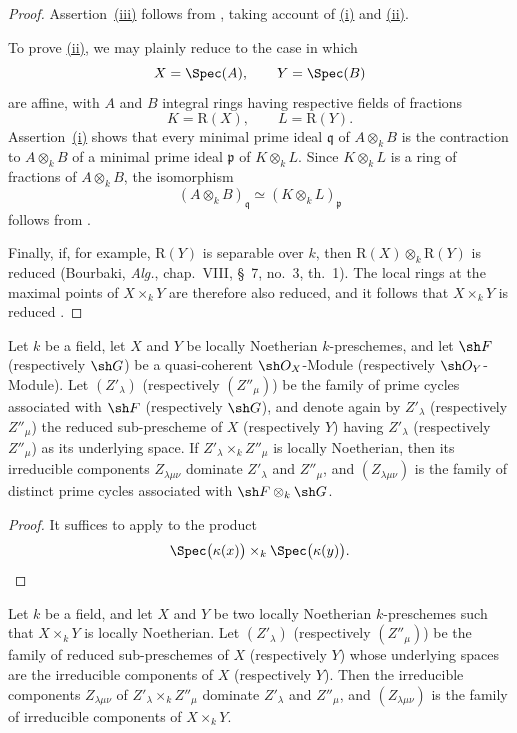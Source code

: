 \begin{proof}
Assertion~{\hyperref[IV.4.2.4.iii]{(iii)}} follows from
, taking account of
{\hyperref[IV.4.2.4.i]{(i)}} and {\hyperref[IV.4.2.4.ii]{(ii)}}.

To prove {\hyperref[IV.4.2.4.ii]{(ii)}}, we may plainly reduce to the case
in which
\[
X=\Spec(A),
\qquad
Y=\Spec(B)
\]
are affine, with $A$ and $B$ integral rings having respective fields of
fractions
\[
K=\mathrm R(X),
\qquad
L=\mathrm R(Y).
\]
Assertion~{\hyperref[IV.4.2.4.i]{(i)}} shows that every minimal prime ideal
$\mathfrak q$ of $A\otimes_k B$ is the contraction to $A\otimes_k B$
of a minimal prime ideal $\mathfrak p$ of $K\otimes_k L$.
Since $K\otimes_k L$ is a ring of fractions of $A\otimes_k B$, the
isomorphism
\[
(A\otimes_k B)_{\mathfrak q}
\simeq
(K\otimes_k L)_{\mathfrak p}
\]
follows from .

Finally, if, for example, $\mathrm R(Y)$ is separable over $k$, then
$\mathrm R(X)\otimes_k\mathrm R(Y)$ is reduced
(Bourbaki, \emph{Alg.}, chap.~VIII, \S~7, no.~3, th.~1).
The local rings at the maximal points of $X\times_k Y$ are therefore
also reduced, and it follows that $X\times_k Y$ is reduced
.
\end{proof}

\begin{proposition}[4.2.5]
\label{IV.4.2.5}
Let $k$ be a field, let $X$ and $Y$ be locally Noetherian
$k$-preschemes, and let $\sh F$ (respectively $\sh G$) be a
quasi-coherent $\sh O_X$-Module (respectively $\sh O_Y$-Module).
Let $(Z'_\lambda)$ (respectively $(Z''_\mu)$) be the family of prime
cycles associated with $\sh F$ (respectively $\sh G$), and denote again
by $Z'_\lambda$ (respectively $Z''_\mu$) the reduced sub-prescheme of
$X$ (respectively $Y$) having $Z'_\lambda$ (respectively $Z''_\mu$) as
its underlying space.
If $Z'_\lambda\times_k Z''_\mu$ is locally Noetherian, then its
irreducible components $Z_{\lambda\mu\nu}$ dominate $Z'_\lambda$ and
$Z''_\mu$, and $(Z_{\lambda\mu\nu})$ is the family of distinct prime
cycles associated with $\sh F\otimes_k\sh G$.
\end{proposition}

\begin{proof}
It suffices to apply  to the product
\[
\Spec\bigl(\kappa(x)\bigr)\times_k\Spec\bigl(\kappa(y)\bigr).
\]
\end{proof}

\begin{corollary}[4.2.6]
\label{IV.4.2.6}
Let $k$ be a field, and let $X$ and $Y$ be two locally Noetherian
$k$-preschemes such that $X\times_k Y$ is locally Noetherian.
Let $(Z'_\lambda)$ (respectively $(Z''_\mu)$) be the family of reduced
sub-preschemes of $X$ (respectively $Y$) whose underlying spaces are
the irreducible components of $X$ (respectively $Y$).
Then the irreducible components $Z_{\lambda\mu\nu}$ of
$Z'_\lambda\times_k Z''_\mu$ dominate $Z'_\lambda$ and $Z''_\mu$, and
$(Z_{\lambda\mu\nu})$ is the family of irreducible components of
$X\times_k Y$.
\end{corollary}

